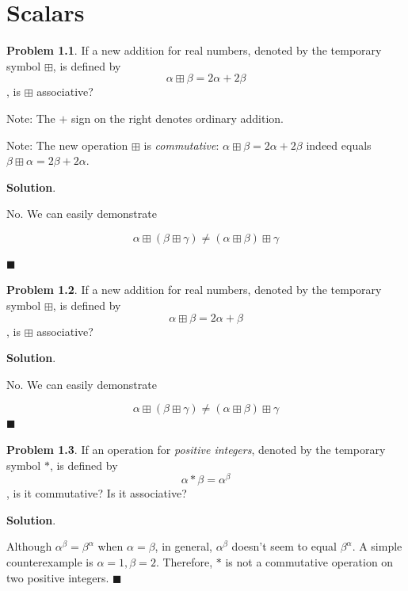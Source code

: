 \documentclass[english,notitlepage,smartquotes]{hgbreport}
\theoremstyle{definition}
\theoremstyle{definition}
\newtheorem{problem}{Problem}
\theoremstyle{remark}
\theoremstyle{plain}
\theoremstyle{definition}
\renewcommand\qedsymbol{$\blacksquare$}
\theoremstyle{definition}
\begin{document}
\tableofcontents

\chapter{Scalars}
\begin{problem}
\label{pr:2a2b}
If a new addition for real numbers, denoted by the temporary symbol $\boxplus$, is defined by
$$
\alpha\boxplus\beta=2\alpha+2\beta
$$
, is $\boxplus$ associative?

Note: The $+$ sign on the right denotes ordinary addition.

Note: The new operation $\boxplus$ is \textit{commutative}: $\alpha\boxplus\beta=2\alpha+2\beta$ indeed equals $\beta\boxplus\alpha=2\beta+2\alpha$.
\end{problem}

\textbf{Solution}.

No. We can easily demonstrate 

$$
\alpha\boxplus(\beta\boxplus\gamma)\ne(\alpha\boxplus\beta)\boxplus\gamma
$$


\qedsymbol

\begin{problem}
\label{pr:2ab}
If a new addition for real numbers, denoted by the temporary symbol $\boxplus$, is defined by
$$
\alpha\boxplus\beta=2\alpha+\beta
$$
, is $\boxplus$ associative?
\end{problem}

\textbf{Solution}.

No. We can easily demonstrate 

$$
\alpha\boxplus(\beta\boxplus\gamma)\ne(\alpha\boxplus\beta)\boxplus\gamma
$$
\qedsymbol

\begin{problem}
\label{pr:atob}
If an operation for \emph{positive integers}, denoted by the temporary symbol $*$, is defined by
$$
\alpha*\beta=\alpha^\beta
$$
, is it commutative? Is it associative?
\end{problem}

\textbf{Solution}.

Although $\alpha^\beta=\beta^\alpha$ when $\alpha=\beta$, in general, $\alpha^{\beta}$ doesn't seem to equal $\beta^\alpha$. A simple counterexample is $\alpha=1,\beta=2$. Therefore, $*$ is not a commutative operation on two positive integers.
\qedsymbol
\end{document}

